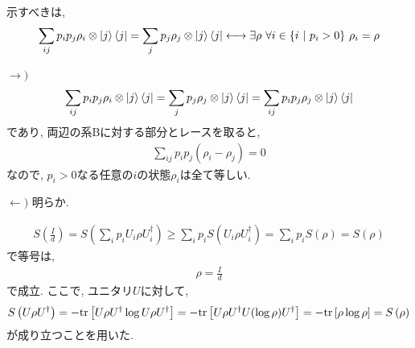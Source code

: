 \begin{ex}
    \label{ex11.17}
\end{ex}

\begin{ex}
    \label{ex11.18}
    示すべきは,
    \begin{align*}
        \sum_{ij} p_i p_j \rho_i \otimes \ket{j}\bra{j}
        =
        \sum_{j} p_j \rho_j \otimes \ket{j}\bra{j}
        \longleftrightarrow
        \exists \rho \ \forall i \in \{ i \ |\  p_i > 0 \} \ \rho_i = \rho
    \end{align*}
    \par
    $\longrightarrow)$
    \begin{align*}
        \sum_{ij} p_i p_j \rho_i \otimes \ket{j}\bra{j}
        =
        \sum_{j} p_j \rho_j \otimes \ket{j}\bra{j}
        =
        \sum_{ij} p_i p_j \rho_j \otimes \ket{j}\bra{j}
    \end{align*}
    であり, 両辺の系Bに対する部分とレースを取ると,
    \begin{align*}
        \sum_{ij} p_i p_j (\rho_i - \rho_j) = 0
    \end{align*}
    なので, $p_i > 0$なる任意の$i$の状態$\rho_i$は全て等しい.
    \par
    $\longleftarrow)$
    明らか.
\end{ex}


\begin{ex}
    \label{ex11.19}

    \begin{align*}
        S \left( \frac{I}{d}\right)
        =
        S \left( \sum_i p_i U_i \rho U_i^\dagger \right)
        \geq
        \sum_i p_i S \left( U_i \rho U_i^\dagger \right)
        =
        \sum_i p_i S\left( \rho \right)
        =
        S\left( \rho \right)
    \end{align*}
    で等号は,
    \begin{align*}
        \rho = \frac{I}{d}
    \end{align*}
    で成立. ここで, ユニタリ$U$に対して,
    \begin{align*}
        S \left( U \rho U^\dagger \right)
        =
        - \mathrm{tr} \left[ U \rho U^\dagger \log U \rho U^\dagger\right]
        =
        - \mathrm{tr} \left[ U \rho U^\dagger U (\log \rho) U^\dagger\right]
        =
        - \mathrm{tr} \left[ \rho \log \rho\right]
        =
        S \left( \rho\right)
    \end{align*}
    が成り立つことを用いた.
\end{ex}

